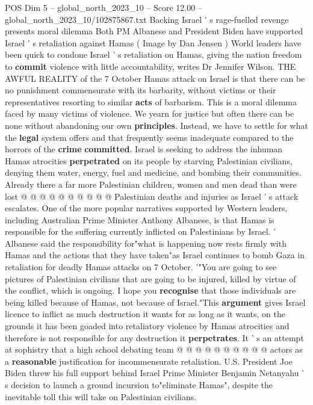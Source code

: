 \begin{textsample}{POS Dim 5 – global\_north\_2023\_10 – Score 12.00 – global\_north\_2023\_10/102875867.txt}  \label{ex:f5_pos_425}
Backing Israel ' s rage-fuelled revenge presents moral dilemma Both PM Albanese and President Biden have supported Israel ' s retaliation against Hamas ( Image by Dan Jensen ) World leaders have been quick to condone Israel ' s retaliation on Hamas, giving the nation freedom to \textbf{commit} violence with little accountability, writes Dr Jennifer Wilson.
THE AWFUL REALITY of the 7 October Hamas attack on Israel is that there can be no punishment commensurate with its barbarity, without victims or their representatives resorting to similar \textbf{acts} of barbarism.
This is a moral dilemma faced by many victims of violence.
We yearn for justice but often there can be none without abandoning our own \textbf{principles}.
Instead, we have to settle for what the \textbf{legal} system offers and that frequently seems inadequate compared to the horrors of the \textbf{crime} \textbf{committed}.
Israel is seeking to address the inhuman Hamas atrocities \textbf{perpetrated} on its people by starving Palestinian civilians, denying them water, energy, fuel and medicine, and bombing their communities.
Already there a far more Palestinian children, women and men dead than were lost @ @ @ @ @ @ @ @ @ @ Palestinian deaths and injuries as Israel ' s attack escalates.
One of the more popular narratives supported by Western leaders, including Australian Prime Minister Anthony Albanese, is that Hamas is responsible for the suffering currently inflicted on Palestinians by Israel. ' Albanese said the responsibility for"what is happening now rests firmly with Hamas and the actions that they have taken"as Israel continues to bomb Gaza in retaliation for deadly Hamas attacks on 7 October. '"You are going to see pictures of Palestinian civilians that are going to be injured, killed by virtue of the conflict, which is ongoing.
I hope you \textbf{recognise} that those individuals are being killed because of Hamas, not because of Israel."This \textbf{argument} gives Israel licence to inflict as much destruction it wants for as long as it wants, on the grounds it has been goaded into retaliatory violence by Hamas atrocities and therefore is not responsible for any destruction it \textbf{perpetrates}.
It ' s an attempt at sophistry that a high school debating team @ @ @ @ @ @ @ @ @ @ actors as a \textbf{reasonable} justification for incommensurate retaliation.
U.S.
President Joe Biden threw his full support behind Israel Prime Minister Benjamin Netanyahu ' s decision to launch a ground incursion to"eliminate Hamas", despite the inevitable toll this will take on Palestinian civilians.

\end{textsample}
